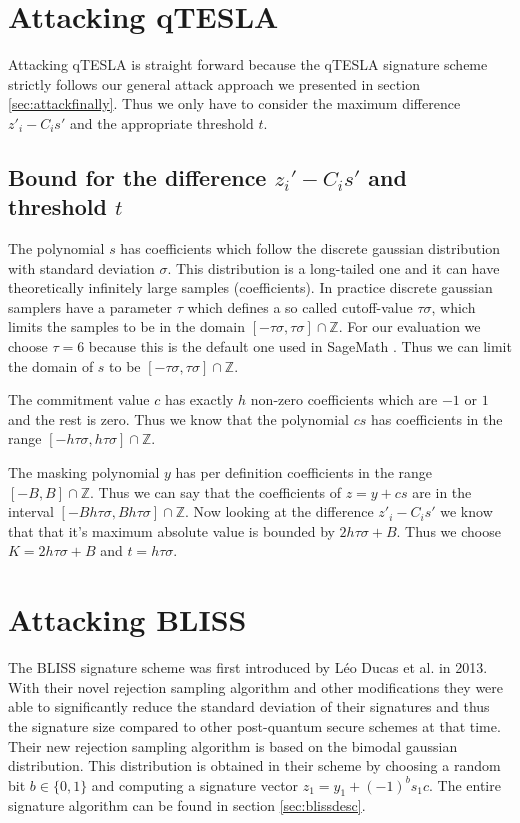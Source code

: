 \section{Attacking qTESLA}
\label{sec:attackqtesla}
Attacking qTESLA is straight forward because the qTESLA signature scheme strictly follows our general attack approach we presented in section \ref{sec:attackfinally}. Thus we only have to consider the maximum difference $z'_{i} - C_{i}s'$ and the appropriate threshold $t$.

\subsection{Bound for the difference $z_{i}' - C_{i}s'$ and threshold $t$}
\label{sec:qteslathreshold}
The polynomial $s$ has coefficients which follow the discrete gaussian distribution with standard deviation $\sigma$. This distribution is a long-tailed one and it can have theoretically infinitely large samples (coefficients). In practice discrete gaussian samplers have a parameter $\tau$ which defines a so called cutoff-value $\tau \sigma$, which limits the samples to be in the domain $[-\tau \sigma, \tau \sigma] \cap \mathds{Z}$. For our evaluation we choose $\tau = 6$ because this is the default one used in SageMath \cite{WEB:Sage}. Thus we can limit the domain of $s$ to be $[-\tau \sigma, \tau \sigma] \cap \mathds{Z}$.%

The commitment value $c$ has exactly $h$ non-zero coefficients which are $-1$ or $1$ and the rest is zero. Thus we know that the polynomial $cs$ has coefficients in the range $[-h \tau \sigma, h \tau \sigma] \cap \mathds{Z}$.

The masking polynomial $y$ has per definition coefficients in the range $[-B, B] \cap \mathds{Z}$. Thus we can say that the coefficients of $z = y+cs$ are in the interval $[-B h \tau \sigma, B h \tau \sigma] \cap \mathds{Z}$.
Now looking at the difference $z'_{i} - C_{i}s'$ we know that that it's maximum absolute value is bounded by $2 h \tau \sigma + B$. Thus we choose $K = 2 h \tau \sigma + B$ and $t = h \tau \sigma$.


\section{Attacking BLISS}
\label{sec:attackbliss}
The BLISS \cite{bliss} signature scheme was first introduced by Léo Ducas et al. in 2013. With their novel rejection sampling algorithm and other modifications they were able to significantly reduce the standard deviation of their signatures and thus the signature size compared to other post-quantum secure schemes at that time. Their new rejection sampling algorithm is based on the bimodal gaussian distribution. This distribution is obtained in their scheme by choosing a random bit $b \in \{0, 1\}$ and computing a signature vector $z_{1} = y_{1} + (-1)^{b} s_{1}c$. The entire signature algorithm can be found in section \ref{sec:blissdesc}.


